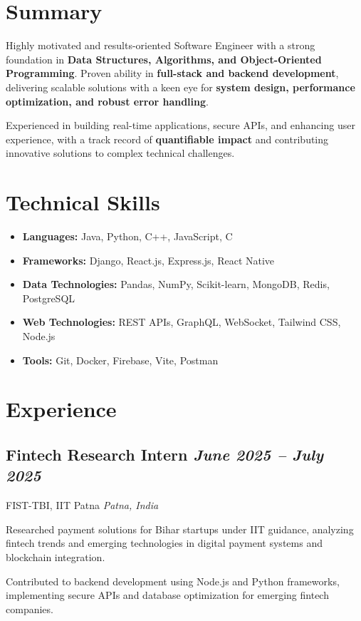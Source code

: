 \documentclass[10pt]{article}
\newcommand{\resitem}[1]{\item \RaggedRight #1}
\newcommand{\role}[1]{\textbf{#1}}
\newcommand{\company}[1]{#1}
\newcommand{\location}[1]{\textit{#1}}
\newcommand{\dates}[1]{\hfill \textit{#1}}
\begin{document}
\thispagestyle{firstpage} %

\section*{Summary}
\begin{resumeitems}
    \resitem{Highly motivated and results-oriented Software Engineer with a strong foundation in \textbf{Data Structures, Algorithms, and Object-Oriented Programming}. Proven ability in \textbf{full-stack and backend development}, delivering scalable solutions with a keen eye for \textbf{system design, performance optimization, and robust error handling}.}
    \resitem{Experienced in building real-time applications, secure APIs, and enhancing user experience, with a track record of \textbf{quantifiable impact} and contributing innovative solutions to complex technical challenges.}
\end{resumeitems}

\section*{Technical Skills}
\begin{itemize}[leftmargin=*, label={}]
    \item \textbf{Languages:} Java, Python, C++, JavaScript, C
    \item \textbf{Frameworks:} Django, React.js, Express.js, React Native
    \item \textbf{Data Technologies:} Pandas, NumPy, Scikit-learn, MongoDB, Redis, PostgreSQL
    \item \textbf{Web Technologies:} REST APIs, GraphQL, WebSocket, Tailwind CSS, Node.js
    \item \textbf{Tools:} Git, Docker, Firebase, Vite, Postman
\end{itemize}

\section*{Experience}
\subsection*{\role{Fintech Research Intern} \dates{June 2025 – July 2025}}
\company{FIST-TBI, IIT Patna} \location{Patna, India}
\begin{resumeitems}
    \resitem{Researched payment solutions for Bihar startups under IIT guidance, analyzing fintech trends and emerging technologies in digital payment systems and blockchain integration.}
    \resitem{Contributed to backend development using Node.js and Python frameworks, implementing secure APIs and database optimization for emerging fintech companies.}
\end{resumeitems}
\end{document}
